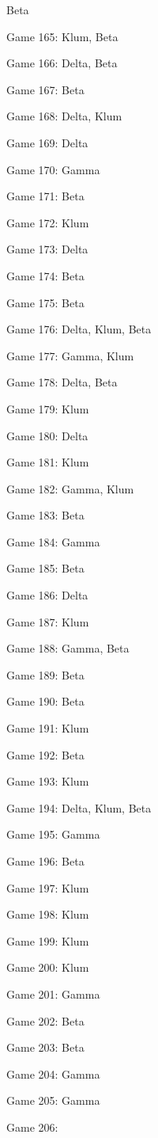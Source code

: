 \documentclass{article}
\begin{document}
\begin{multicols}{3}
\begin{compactitem}
Beta
\item Game 165:
Klum, Beta
\item Game 166:
Delta, Beta
\item Game 167:
Beta
\item Game 168:
Delta, Klum
\item Game 169:
Delta
\item Game 170:
Gamma
\item Game 171:
Beta
\item Game 172:
Klum
\item Game 173:
Delta
\item Game 174:
Beta
\item Game 175:
Beta
\item Game 176:
Delta, Klum, Beta
\item Game 177:
Gamma, Klum
\item Game 178:
Delta, Beta
\item Game 179:
Klum
\item Game 180:
Delta
\item Game 181:
Klum
\item Game 182:
Gamma, Klum
\item Game 183:
Beta
\item Game 184:
Gamma
\item Game 185:
Beta
\item Game 186:
Delta
\item Game 187:
Klum
\item Game 188:
Gamma, Beta
\item Game 189:
Beta
\item Game 190:
Beta
\item Game 191:
Klum
\item Game 192:
Beta
\item Game 193:
Klum
\item Game 194:
Delta, Klum, Beta
\item Game 195:
Gamma
\item Game 196:
Beta
\item Game 197:
Klum
\item Game 198:
Klum
\item Game 199:
Klum
\item Game 200:
Klum
\item Game 201:
Gamma
\item Game 202:
Beta
\item Game 203:
Beta
\item Game 204:
Gamma
\item Game 205:
Gamma
\item Game 206:

\end{compactitem}
\end{multicols}
\end{document}
